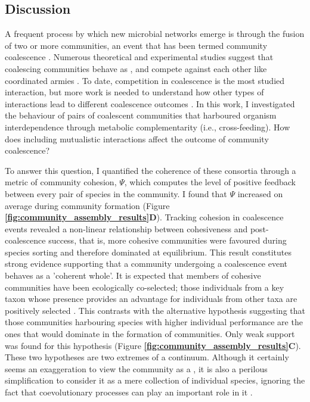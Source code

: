 \documentclass[titlepage,11pt]{article}
\begin{document}
\begin{linenumbers}
		\section{Discussion}
			\hspace{15pt}A frequent process by which new microbial networks emerge is through the fusion of two or more communities, an event that has been termed community coalescence  \citep{Rillig2015}. Numerous theoretical and experimental studies suggest that coalescing communities behave as , and compete against each other like coordinated armies \citep{Gilpin1994, Toquenaga1997, Livingston2013, Tikhonov2016, Tikhonov2017, Sierocinski2017, Lu2018}. To date, competition in coalescence is the most studied interaction, but more work is needed to understand how other types of interactions lead to different coalescence outcomes \citep{Castledine2020}. In this work, I investigated the behaviour of pairs of coalescent communities that harboured organism interdependence through metabolic complementarity (i.e., cross-feeding). How does including mutualistic interactions affect the outcome of community coalescence?\par
			To answer this question, I quantified the coherence of these consortia through a metric of community cohesion, $ \Psi $, which computes the level of positive feedback between every pair of species in the community. I found that $ \Psi $ increased on average  during community formation (Figure \textbf{\ref{fig:community_assembly_results}D}). Tracking cohesion in coalescence events revealed a non-linear relationship between cohesiveness and post-coalescence success, that is, more cohesive communities were favoured during species sorting and therefore dominated at equilibrium. This result constitutes strong evidence supporting that a community undergoing a coalescence event behaves as a 'coherent whole'. It is expected that members of cohesive communities have been ecologically co-selected; those individuals from a key taxon whose presence provides an advantage for individuals from other taxa are positively selected \citep{Sierocinski2017}. This contrasts with the alternative hypothesis suggesting that those communities harbouring species with higher individual performance are the ones that would dominate in the formation of communities. Only weak support was found for this hypothesis (Figure \textbf{\ref{fig:community_assembly_results}C}). These two hypotheses are two extremes of a continuum. Although it certainly seems an exaggeration to view the community as a , it is also a perilous simplification to consider it as a mere collection of individual species, ignoring the fact that coevolutionary processes can play an important role in it \citep{Rillig2017}.\par

\end{linenumbers}
\end{document}

